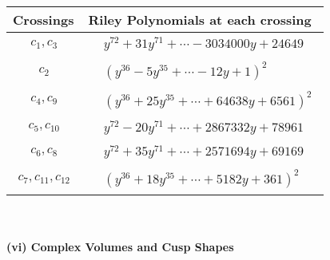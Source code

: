\documentclass[1p]{elsarticle_modified}
\theoremstyle{definition}
\begin{document}
\begin{tabular}{m{50pt}|m{274pt}}
Crossings & \hspace{64pt}Riley Polynomials at each crossing \\
\hline $$\begin{aligned}c_{1},c_{3}\end{aligned}$$&$\begin{aligned}
&y^{72}+31 y^{71}+\cdots-3034000 y+24649
\end{aligned}$\\
\hline $$\begin{aligned}c_{2}\end{aligned}$$&$\begin{aligned}
&(y^{36}-5 y^{35}+\cdots-12 y+1)^{2}
\end{aligned}$\\
\hline $$\begin{aligned}c_{4},c_{9}\end{aligned}$$&$\begin{aligned}
&(y^{36}+25 y^{35}+\cdots+64638 y+6561)^{2}
\end{aligned}$\\
\hline $$\begin{aligned}c_{5},c_{10}\end{aligned}$$&$\begin{aligned}
&y^{72}-20 y^{71}+\cdots+2867332 y+78961
\end{aligned}$\\
\hline $$\begin{aligned}c_{6},c_{8}\end{aligned}$$&$\begin{aligned}
&y^{72}+35 y^{71}+\cdots+2571694 y+69169
\end{aligned}$\\
\hline $$\begin{aligned}c_{7},c_{11},c_{12}\end{aligned}$$&$\begin{aligned}
&(y^{36}+18 y^{35}+\cdots+5182 y+361)^{2}
\end{aligned}$\\
\hline
\end{tabular}\\~\\
\newpage\flushleft \textbf{(vi) Complex Volumes and Cusp Shapes}
\end{document}
